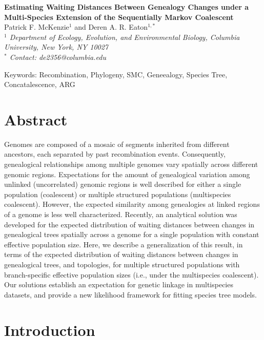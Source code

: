 \documentclass[11pt]{article}
\begin{document}
\begin{center}
	{\bf \Large
		Estimating Waiting Distances Between Genealogy Changes under a \\[0.25cm]
		Multi-Species Extension of the Sequentially Markov Coalescent
	}\\[0.5cm]

	Patrick F. McKenzie$^{1}$ and Deren A. R. Eaton$^{1, *}$\\[0.25cm]

	\emph{
	$^{1}$ Department of Ecology, Evolution, and Environmental Biology, Columbia University, New York, NY 10027\\[0.5cm]
	$^{*}$ Contact: de2356@columbia.edu\\[0.5cm]
	}
\end{center}

Keywords: Recombination, Phylogeny, SMC, Geneealogy, Species Tree, Concatalescence, ARG

\RaggedRight

\section*{Abstract}
Genomes are composed of a mosaic of segments inherited from different ancestors, 
each separated by past recombination events. Consequently, genealogical
relationships among multiple genomes vary spatially across different genomic 
regions. Expectations for the amount of genealogical variation among unlinked 
(uncorrelated) genomic regions is well described for either a single 
population (coalescent) or multiple structured populations (multispecies coalescent).
However, the expected similarity among genealogies at linked regions of a 
genome is less well characterized. 
Recently, an analytical solution was developed for the expected 
distribution of waiting distances between changes in genealogical trees 
spatially across a genome for a single population with constant effective 
population size. Here, we describe a generalization of this 
result, in terms of the expected distribution of waiting distances between 
changes in genealogical trees, and topologies, for multiple structured populations
with branch-specific effective population sizes (i.e., under the multispecies 
coalescent). Our solutions establish an expectation for genetic linkage  
in multispecies datasets, and provide a new likelihood framework for 
fitting species tree models. %

\section{Introduction}
\end{document}
